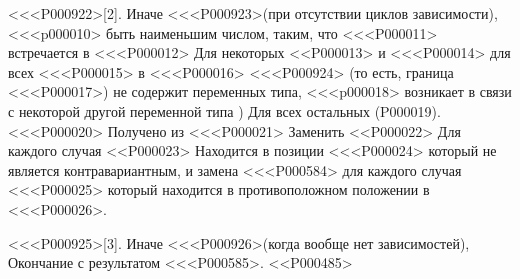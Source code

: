 <<<P000922>[2].
Иначе
<<<P000923>{(при отсутствии циклов зависимости)},
<<<p000010> быть наименьшим числом, таким, что <<<P000011> встречается в <<<P000012> Для некоторых <<P000013>
и <<<P000014> для всех <<<P000015> в <<<P000016>
<<<P000924>{%
(то есть, граница <<<P000017>) не содержит переменных типа,
<<<p000018> возникает в связи с некоторой другой переменной типа )%
}
Для всех остальных (P000019).
<<<P000020> Получено из <<<P000021>
Заменить <<P000022> Для каждого случая <<P000023>
Находится в позиции <<<P000024> который не является контравариантным,
и замена <<<P000584> для каждого случая <<<P000025>
который находится в противоположном положении в <<<P000026>.

<<<P000925>[3].
Иначе
<<<P000926>{(когда вообще нет зависимостей)},
Окончание с результатом <<<P000585>.
<<P000485>

